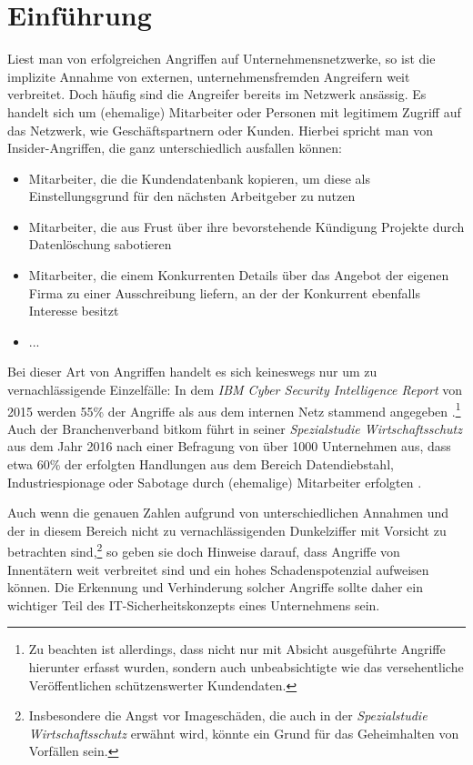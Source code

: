 \chapter{Einführung}

\label{cha_introduction}


Liest man von erfolgreichen Angriffen auf Unternehmensnetzwerke, so ist die implizite Annahme von externen, unternehmensfremden Angreifern weit verbreitet. Doch häufig sind die Angreifer bereits im Netzwerk ansässig. Es handelt sich um (ehemalige) Mitarbeiter oder Personen mit legitimem Zugriff auf das Netzwerk, wie Geschäftspartnern oder Kunden. Hierbei spricht man von Insider-Angriffen, die ganz unterschiedlich ausfallen können:
\begin{itemize}
  \item Mitarbeiter, die die Kundendatenbank kopieren, um diese als Einstellungsgrund für den nächsten Arbeitgeber zu nutzen
  \item Mitarbeiter, die aus Frust über ihre bevorstehende Kündigung Projekte durch Datenlöschung sabotieren
  \item Mitarbeiter, die einem Konkurrenten Details über das Angebot der eigenen Firma zu einer Ausschreibung liefern, an der der Konkurrent ebenfalls Interesse besitzt
  \item ...
\end{itemize}
Bei dieser Art von Angriffen handelt es sich keineswegs nur um zu vernachlässigende Einzelfälle:
In dem \textit{IBM Cyber Security Intelligence Report} von 2015 werden 55\% der Angriffe als aus dem internen Netz stammend angegeben \cite{ibm2015}.\footnote{
  Zu beachten ist allerdings, dass nicht nur mit Absicht ausgeführte Angriffe hierunter erfasst wurden, sondern auch unbeabsichtigte wie das versehentliche Veröffentlichen schützenswerter Kundendaten.
}
Auch der Branchenverband bitkom führt in seiner \textit{Spezialstudie Wirtschaftsschutz} aus dem Jahr 2016 nach einer Befragung von über 1000 Unternehmen aus, dass etwa 60\% der erfolgten Handlungen aus dem Bereich Datendiebstahl, Industriespionage oder Sabotage durch (ehemalige) Mitarbeiter erfolgten \cite{bitkom2016}.

Auch wenn die genauen Zahlen aufgrund von unterschiedlichen Annahmen und der in diesem Bereich nicht zu vernachlässigenden Dunkelziffer mit Vorsicht zu betrachten sind,\footnote{
	Insbesondere die Angst vor Imageschäden, die auch in der \textit{Spezialstudie Wirtschaftsschutz} erwähnt wird, könnte ein Grund für das Geheimhalten von Vorfällen sein.
} so geben sie doch Hinweise darauf, dass Angriffe von Innentätern weit verbreitet sind und ein hohes Schadenspotenzial aufweisen können. Die Erkennung und Verhinderung solcher Angriffe sollte daher ein wichtiger Teil des IT-Sicherheitskonzepts eines Unternehmens sein.

